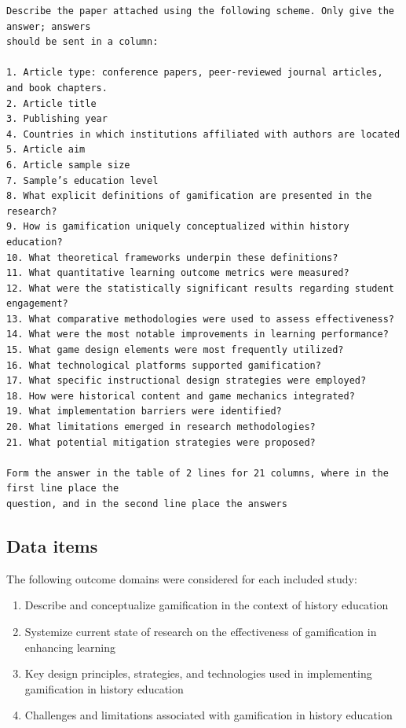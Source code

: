 \documentclass[a4paper,fleqn]{cas-sc}
\begin{document}



\begin{verbatim}
Describe the paper attached using the following scheme. Only give the answer; answers 
should be sent in a column:

1. Article type: conference papers, peer-reviewed journal articles, and book chapters.
2. Article title
3. Publishing year 
4. Countries in which institutions affiliated with authors are located
5. Article aim
6. Article sample size
7. Sample’s education level 
8. What explicit definitions of gamification are presented in the research?
9. How is gamification uniquely conceptualized within history education?
10. What theoretical frameworks underpin these definitions?
11. What quantitative learning outcome metrics were measured?
12. What were the statistically significant results regarding student engagement?
13. What comparative methodologies were used to assess effectiveness?
14. What were the most notable improvements in learning performance?
15. What game design elements were most frequently utilized?
16. What technological platforms supported gamification?
17. What specific instructional design strategies were employed?
18. How were historical content and game mechanics integrated?
19. What implementation barriers were identified?
20. What limitations emerged in research methodologies?
21. What potential mitigation strategies were proposed?

Form the answer in the table of 2 lines for 21 columns, where in the first line place the 
question, and in the second line place the answers
\end{verbatim}



\subsection{Data items}
The following outcome domains were considered for each included study:

\begin{enumerate}[noitemsep]
 \item Describe and conceptualize gamification in the context of history education 
 \item Systemize current state of research on the effectiveness of gamification in enhancing
learning 
 \item Key design principles, strategies, and technologies used in implementing
gamification in history education
 \item Challenges and limitations associated with gamification in history education
\end{enumerate}
\end{document}
